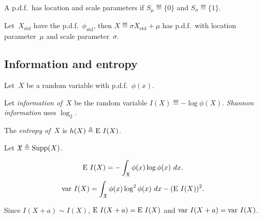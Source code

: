 \documentclass[10pt,a4paper]{article}
\theoremstyle{plain} \newtheorem{Lem}{Lemma}
\begin{document}
A p.d.f.~has location and scale parameters if $S_\mu \eqdef \{0\}$ and $S_\sigma \eqdef \{1\}$.

Let~$X_{\mathrm {std}}$ have the p.d.f.~$\phi_{\mathrm {std}}$,
then $X \eqdef \sigma X_{\mathrm {std}} + \mu$ has p.d.f.~with location parameter~$\mu$ and scale parameter~$\sigma$.


\subsection{Information and entropy}
Let~$X$ be a random variable with p.d.f.~$\phi(x)$.

Let {\em information of~$X$} be the random variable $I(X) \eqdef -\log \phi(X)$.
{\em Shannon information} uses $\log_2$.

The {\em entropy of~$X$} is $h(X) \triangleq \mathrm E \  I (X)$.

Let $\mathfrak X \triangleq \mathrm {Supp}(X)$.

$$\mathrm E \  I(X) = - \int_{\mathfrak X} \phi(x) \log \phi(x) \ dx. $$
$$\mathrm {var} \  I(X) = \int_{\mathfrak X} \phi(x) \log^2 \phi(x) \ dx - (\mathrm E \  I(X))^2.$$

Since $I(X + a) \sim I(X)$,
$\mathrm E \  I(X + a) = \mathrm E \  I(X)$ and $\mathrm {var} \  I(X + a) = \mathrm {var} \  I(X)$.
\end{document}
